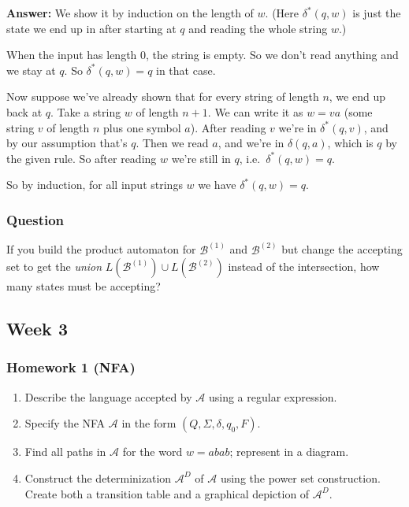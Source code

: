 \documentclass{article}
\theoremstyle{theorem}
\theoremstyle{definition}
\theoremstyle{remark}
\begin{document}
\textbf{Answer:}
We show it by induction on the length of $w$. (Here $\delta^*(q,w)$ is just the state we end up in after starting at $q$ and reading the whole string $w$.)

When the input has length $0$, the string is empty. So we don't read anything and we stay at $q$. So $\delta^*(q,w) = q$ in that case.

Now suppose we've already shown that for every string of length $n$, we end up back at $q$. Take a string $w$ of length $n+1$. We can write it as $w = va$ (some string $v$ of length $n$ plus one symbol $a$). After reading $v$ we're in $\delta^*(q,v)$, and by our assumption that's $q$. Then we read $a$, and we're in $\delta(q,a)$, which is $q$ by the given rule. So after reading $w$ we're still in $q$, i.e.\ $\delta^*(q,w) = q$.

So by induction, for all input strings $w$ we have $\delta^*(q,w) = q$.

\subsubsection*{Question}
If you build the product automaton for $\mathcal{B}^{(1)}$ and $\mathcal{B}^{(2)}$ but change the accepting set to get the \emph{union} $L(\mathcal{B}^{(1)}) \cup L(\mathcal{B}^{(2)})$ instead of the intersection, how many states must be accepting?

\subsection{Week 3}\label{sec:week3}

\subsubsection*{Homework 1 (NFA)}
\begin{enumerate}
  \item Describe the language accepted by $\mathcal{A}$ using a regular expression.
  \item Specify the NFA $\mathcal{A}$ in the form $(Q, \Sigma, \delta, q_0, F)$.
  \item Find all paths in $\mathcal{A}$ for the word $w = abab$; represent in a diagram.
  \item Construct the determinization $\mathcal{A}^D$ of $\mathcal{A}$ using the power set construction. Create both a transition table and a graphical depiction of $\mathcal{A}^D$.
\end{enumerate}
\end{document}
